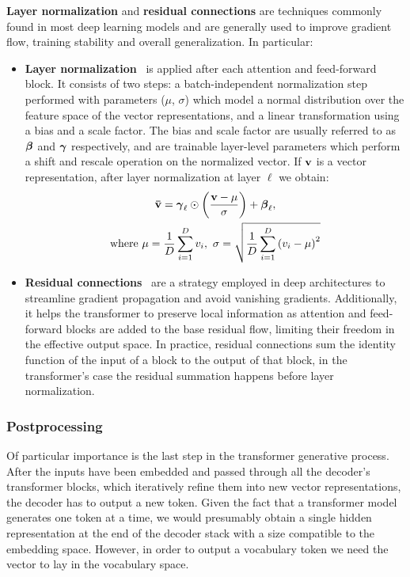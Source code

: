 \textbf{Layer normalization} and \textbf{residual connections} are techniques commonly found in most deep learning models and are generally used to improve gradient flow, training stability and overall generalization.
In particular:
\begin{itemize}
    \item \textbf{Layer normalization}~\cite{ba2016} is applied after each attention and feed-forward block.
It consists of two steps: a batch-independent normalization step performed with parameters ($\mu$, $\sigma$) which model a normal distribution over the feature space of the vector representations, and a linear transformation using a bias and a scale factor.
The bias and scale factor are usually referred to as $\bm{\mathbf{\beta}}$ and $\bm{\mathbf{\gamma}}$ respectively, and are trainable layer-level parameters which perform a shift and rescale operation on the normalized vector.
If $\bm{\mathbf{v}}$ is a vector representation, after layer normalization at layer $\ell$ we obtain:
\begin{subequations}
    \begin{gather}
        \bm{\mathbf{\bar v}} = \bm{\mathbf{\gamma}}_\ell \odot \left( \frac{\bm{\mathbf{v}} - \mu}{\sigma} \right) + \bm{\mathbf{\beta}}_\ell, \label{eq:background_layernorm} \\
        \text{where}\ \mu = \frac{1}{D}\sum_{i=1}^{D}{v_i},\ \sigma = \sqrt{\frac{1}{D}\sum_{i=1}^{D}{{(v_i - \mu)}^2}} \label{eq:background_layernorm_extra}
    \end{gather}
\end{subequations}
    \item \textbf{Residual connections}~\cite{he2016} are a strategy employed in deep architectures to streamline gradient propagation and avoid vanishing gradients.
Additionally, it helps the transformer to preserve local information as attention and feed-forward blocks are added to the base residual flow, limiting their freedom in the effective output space.
In practice, residual connections sum the identity function of the input of a block to the output of that block, in the transformer's case the residual summation happens before layer normalization.
\end{itemize}

\subsubsection*{Postprocessing}

Of particular importance is the last step in the transformer generative process.
After the inputs have been embedded and passed through all the decoder's transformer blocks, which iteratively refine them into new vector representations, the decoder has to output a new token.
Given the fact that a transformer model generates one token at a time, we would presumably obtain a single hidden representation at the end of the decoder stack with a size compatible to the embedding space.
However, in order to output a vocabulary token we need the vector to lay in the vocabulary space.

